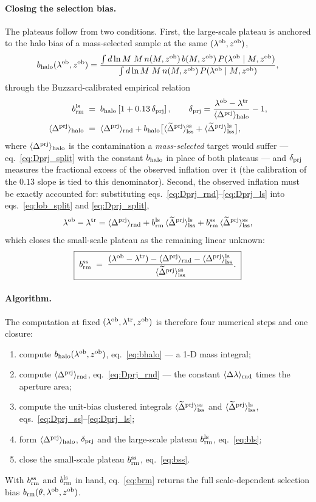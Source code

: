 \documentclass[a4paper, 11pt]{article}
\newcommand{\lob}{\lambda^{\rm ob}}
\newcommand{\ltr}{\lambda^{\rm tr}}
\newcommand{\zob}{z^{\rm ob}}
\newcommand{\dprj}{\Delta^{\rm prj}}
\newcommand{\brm}{b_{\rm rm}}
\newcommand{\brmss}{b_{\rm rm}^{\rm ss}}
\newcommand{\brmls}{b_{\rm rm}^{\rm ls}}
\newcommand{\bhalo}{b_{\rm halo}}
\newcommand{\Dp}{\langle \dprj\rangle}
\newcommand{\Dlrnd}{\langle \Delta\lambda\rangle_{\rm rnd}}
\newcommand{\Dprnd}{\langle \dprj\rangle_{\rm rnd}}
\newcommand{\Dpls}{\langle \dprj\rangle^{\rm ls}_{\rm lss}}
\newcommand{\tDpss}{\langle \widetilde{\Delta}^{\rm prj}\rangle^{\rm ss}_{\rm lss}}
\newcommand{\tDpls}{\langle \widetilde{\Delta}^{\rm prj}\rangle^{\rm ls}_{\rm lss}}
\newcommand{\dprjx}{\delta_{\rm prj}}
\begin{document}
\paragraph{Closing the selection bias.} The plateaus follow from
two conditions. First, the large-scale plateau is anchored to the
halo bias of a mass-selected sample at the same $(\lob,\zob)$,
\begin{equation}
\bhalo(\lob,\zob)
= \frac{\int d\ln M\;M\,n(M,\zob)\,b(M,\zob)\,P(\lob\mid M,\zob)}
       {\int d\ln M\;M\,n(M,\zob)\,P(\lob\mid M,\zob)},
\label{eq:bhalo}
\end{equation}
through the Buzzard-calibrated empirical relation
\begin{align}
\brmls \;&=\; \bhalo \left[ 1 + 0.13\, \dprjx\right],
\qquad
\dprjx
= \frac{\lob-\ltr}{\Dp_{\rm halo}} - 1,
\notag\\
\Dp_{\rm halo} \;&=\; \Dprnd
+ \bhalo\big[\tDpss + \tDpls\big],
\label{eq:bls}
\end{align}
where $\Dp_{\rm halo}$ is the contamination a \emph{mass-selected}
target would suffer --- eq.~\eqref{eq:Dprj_split} with the constant
$\bhalo$ in place of both plateaus --- and $\dprjx$ measures the
fractional excess of the observed inflation over it (the
calibration of the $0.13$ slope is tied to this denominator).
Second, the observed inflation must
be exactly accounted for: substituting
eqs.~\eqref{eq:Dprj_rnd}--\eqref{eq:Dprj_ls} into
eqs.~\eqref{eq:lob_split} and \eqref{eq:Dprj_split},
\begin{equation}
\lob-\ltr = \Dprnd
+ \brmls\,\tDpls
+ \brmss\,\tDpss,
\label{eq:budget}
\end{equation}
which closes the small-scale plateau as the remaining linear
unknown:
\begin{equation}
\boxed{\;
\brmss \;=\;
\frac{(\lob-\ltr) - \Dprnd - \Dpls}
     {\tDpss}.
\;}
\label{eq:bss}
\end{equation}

\paragraph{Algorithm.} The computation at fixed
$(\lob,\ltr,\zob)$ is therefore four numerical steps and one
closure:
\begin{enumerate}
\item compute $\bhalo(\lob,\zob)$, eq.~\eqref{eq:bhalo} --- a
      1-D mass integral;
\item compute $\Dprnd$, eq.~\eqref{eq:Dprj_rnd} --- the constant
      $\Dlrnd$ times the aperture area;
\item compute the unit-bias clustered integrals $\tDpss$ and
      $\tDpls$, eqs.~\eqref{eq:Dprj_ss}--\eqref{eq:Dprj_ls};
\item form $\Dp_{\rm halo}$, $\dprjx$ and the large-scale plateau
      $\brmls$, eq.~\eqref{eq:bls};
\item close the small-scale plateau $\brmss$,
      eq.~\eqref{eq:bss}.
\end{enumerate}
With $\brmss$ and $\brmls$ in hand, eq.~\eqref{eq:brm} returns
the full scale-dependent selection bias
$\brm(\theta,\lob,\zob)$.
\end{document}
